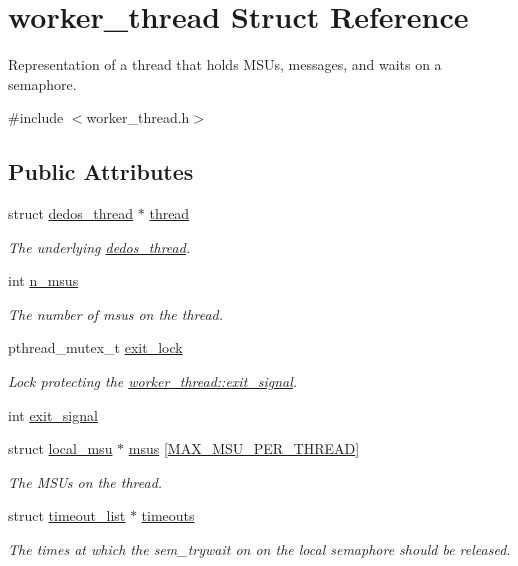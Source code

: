 \hypertarget{structworker__thread}{\section{worker\-\_\-thread Struct Reference}
\label{structworker__thread}
}


Representation of a thread that holds M\-S\-Us, messages, and waits on a semaphore.  




{\ttfamily \#include $<$worker\-\_\-thread.\-h$>$}

\subsection*{Public Attributes}
\begin{DoxyCompactItemize}
\item 
struct \hyperlink{structdedos__thread}{dedos\-\_\-thread} $\ast$ \hyperlink{structworker__thread_a5da2605902d4e02c6c486ed16a76a8df}{thread}
\begin{DoxyCompactList}\small\item\em The underlying \hyperlink{structdedos__thread}{dedos\-\_\-thread}. \end{DoxyCompactList}\item 
int \hyperlink{structworker__thread_a737618048817673c66abf74b29054796}{n\-\_\-msus}
\begin{DoxyCompactList}\small\item\em The number of msus on the thread. \end{DoxyCompactList}\item 
pthread\-\_\-mutex\-\_\-t \hyperlink{structworker__thread_a92b93bfd566a2cef147993fd851beb30}{exit\-\_\-lock}
\begin{DoxyCompactList}\small\item\em Lock protecting the \hyperlink{structworker__thread_a671b6ce2bdb562ebb744b9bcf6764e64}{worker\-\_\-thread\-::exit\-\_\-signal}. \end{DoxyCompactList}\item 
int \hyperlink{structworker__thread_a671b6ce2bdb562ebb744b9bcf6764e64}{exit\-\_\-signal}
\item 
struct \hyperlink{structlocal__msu}{local\-\_\-msu} $\ast$ \hyperlink{structworker__thread_a5b9f22e2454a995f711f92817e5761e2}{msus} \mbox{[}\hyperlink{dfg_8h_a223dc89350ecbd6a5bf07e56bb2d78fe}{M\-A\-X\-\_\-\-M\-S\-U\-\_\-\-P\-E\-R\-\_\-\-T\-H\-R\-E\-A\-D}\mbox{]}
\begin{DoxyCompactList}\small\item\em The M\-S\-Us on the thread. \end{DoxyCompactList}\item 
struct \hyperlink{structtimeout__list}{timeout\-\_\-list} $\ast$ \hyperlink{structworker__thread_a1839face176d6d351d17cd9970396bad}{timeouts}
\begin{DoxyCompactList}\small\item\em The times at which the sem\-\_\-trywait on on the local semaphore should be released. \end{DoxyCompactList}\end{DoxyCompactItemize}



